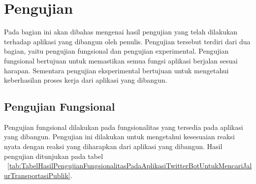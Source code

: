 \section{Pengujian}
Pada bagian ini akan dibahas mengenai hasil pengujian yang telah dilakukan terhadap aplikasi yang dibangun oleh penulis. Pengujian tersebut terdiri dari dua bagian, yaitu pengujian fungsional dan pengujian experimental. Pengujian fungsional bertujuan untuk memastikan semua fungsi aplikasi berjalan sesuai harapan. Sementara pengujian eksperimental bertujuan untuk mengetahui keberhasilan proses kerja dari aplikasi yang dibangun.

\subsection{Pengujian Fungsional}
Pengujian fungsional dilakukan pada fungsionalitas yang tersedia pada aplikasi yang dibangun. Pengujian ini dilakukan untuk mengetahui kesesuaian reaksi nyata dengan reaksi yang diharapkan dari aplikasi yang dibangun. Hasil pengujian ditunjukan pada tabel ~\ref{tab:TabelHasilPengujianFungsionalitasPadaAplikasiTwitterBotUntukMencariJalurTransportasiPublik}.

